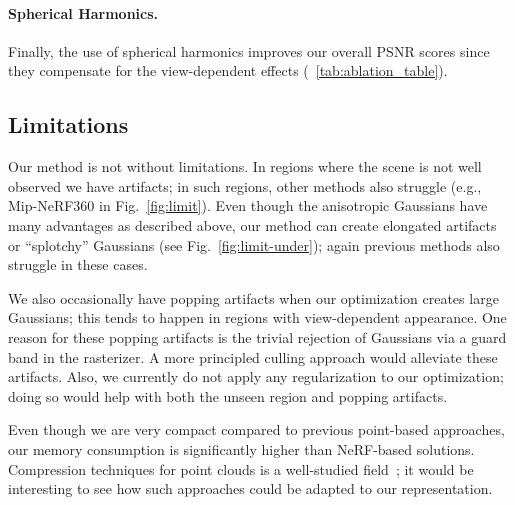 \paragraph{Spherical Harmonics.}
Finally, the use of spherical harmonics improves our overall PSNR scores since they compensate for the view-dependent effects (~\ref{tab:ablation_table}).




\subsection{Limitations}

Our method is not without limitations. 
In regions where the scene is not well observed we have artifacts; in such regions, other methods also struggle (e.g., Mip-NeRF360 in Fig.~\ref{fig:limit}). 
Even though the anisotropic Gaussians have many advantages as described above, 
our method can create elongated artifacts or ``splotchy'' Gaussians (see Fig.~\ref{fig:limit-under}); again previous methods also struggle in these cases.  

We also occasionally have popping artifacts when our optimization creates large Gaussians; this tends to happen in regions with view-dependent appearance. %
One reason for these popping artifacts is the trivial rejection of Gaussians via a guard band in the rasterizer. A more principled culling approach would alleviate these artifacts. 
Also, we currently do not apply any regularization to our optimization; doing so would help with both the unseen region and popping artifacts. 


Even though we are very compact compared to previous point-based approaches, our memory consumption is significantly higher than NeRF-based solutions.  Compression techniques for point clouds is a well-studied field~\cite{de2016compression}; it would be interesting to see how such approaches could be adapted to our representation.



